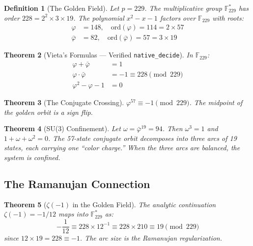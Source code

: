 \documentclass[12pt, letterpaper]{article}
\newtheorem{theorem}{Theorem}[section]
\newtheorem{definition}[theorem]{Definition}
\begin{document}
\begin{definition}[The Golden Field]
Let $p = 229$. The multiplicative group $\mathbb{F}^*_{229}$ has order $228 = 2^2 \times 3 \times 19$. The polynomial $x^2 - x - 1$ factors over $\mathbb{F}_{229}$ with roots:
\begin{align}
    \varphi &= 148, \quad \mathrm{ord}(\varphi) = 114 = 2 \times 57\\
    \bar{\varphi} &= 82, \quad \mathrm{ord}(\bar{\varphi}) = 57 = 3 \times 19
\end{align}
\end{definition}

\begin{theorem}[Vieta's Formulas --- Verified \texttt{native\_decide}]
\label{thm:vieta}
In $\mathbb{F}_{229}$:
\begin{align}
    \varphi + \bar{\varphi} &= 1 \label{eq:vieta_sum}\\
    \varphi \cdot \bar{\varphi} &= -1 \equiv 228 \pmod{229} \label{eq:vieta_prod}\\
    \varphi^2 - \varphi - 1 &= 0 \label{eq:golden}
\end{align}
\end{theorem}

\begin{theorem}[The Conjugate Crossing]
\label{thm:conjugate}
$\varphi^{57} \equiv -1 \pmod{229}$. The midpoint of the golden orbit is a sign flip.
\end{theorem}

\begin{theorem}[SU(3) Confinement]
\label{thm:confinement}
Let $\omega = \bar{\varphi}^{19} = 94$. Then $\omega^3 = 1$ and $1 + \omega + \omega^2 = 0$. The 57-state conjugate orbit decomposes into three arcs of 19 states, each carrying one ``color charge.'' When the three arcs are balanced, the system is confined.
\end{theorem}

\subsection{The Ramanujan Connection}

\begin{theorem}[$\zeta(-1)$ in the Golden Field]
\label{thm:ramanujan}
The analytic continuation $\zeta(-1) = -1/12$ maps into $\mathbb{F}^*_{229}$ as:
\[
-\frac{1}{12} \equiv 228 \times 12^{-1} \equiv 228 \times 210 \equiv 19 \pmod{229}
\]
since $12 \times 19 = 228 \equiv -1$. The arc size is the Ramanujan regularization.
\end{theorem}
\end{document}
